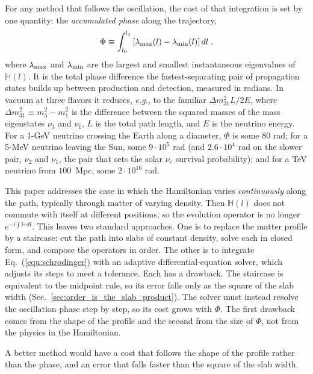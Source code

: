 \documentclass[final,5p,times,twocolumn,sort,compress]{elsarticle}
\makeatletter
\newcommand{\eg}{{\it e.g.}}
\newcommand{\eq}{Eq.}
\DeclareRobustCommand{\_}{%
  \ifmmode\nfss@text{\textunderscore}\else\textunderscore\allowbreak\fi}
\newcommand{\equ}[1]{\eq~(\ref{equ:#1})}
\makeatother
\begin{document}
For any method that follows the oscillation, the cost of that integration is set by one quantity: the \emph{accumulated phase} along the trajectory,
\begin{equation}
 \label{equ:phase}
 \Phi
 \equiv
 \int_{l_0}^{l_1} \left[\lambda_{\rm max}(l) - \lambda_{\rm min}(l)\right] dl \;,
\end{equation}
where $\lambda_{\rm max}$ and $\lambda_{\rm min}$ are the largest and smallest instantaneous eigenvalues of $\mathbb{H}(l)$. It is the total phase difference the fastest-separating pair of propagation states builds up between production and detection, measured in radians.  In vacuum at three flavors it reduces, \eg, to the familiar $\Delta m^2_{31} L / 2E$, where $\Delta m^2_{31} \equiv m_3^2 - m_1^2$ is the difference between the squared masses of the mass eigenstates $\nu_3$ and $\nu_1$, $L$ is the total path length, and $E$ is the neutrino energy. For a 1-GeV neutrino crossing the Earth along a diameter, $\Phi$ is some $80$ rad; for a 5-MeV neutrino leaving the Sun, some $9 \cdot 10^{5}$ rad (and $2.6 \cdot 10^{4}$ rad on the slower pair, $\nu_2$ and $\nu_1$, the pair that sets the solar $\nu_e$ survival probability); and for a TeV neutrino from $100$~Mpc, some $2 \cdot 10^{16}$ rad.

This paper addresses the case in which the Hamiltonian varies \emph{continuously} along the path, typically through matter of varying density. Then $\mathbb{H}(l)$ does not commute with itself at different positions, so the evolution operator is no longer $e^{-i\int \mathbb{H}\,dl}$. This leaves two standard approaches. One is to replace the matter profile by a staircase: cut the path into slabs of constant density, solve each in closed form, and compose the operators in order. The other is to integrate \equ{schrodinger} with an adaptive differential-equation solver, which adjusts its steps to meet a tolerance. Each has a drawback. The staircase is equivalent to the midpoint rule, so its error falls only as the square of the slab width (Sec.~\ref{sec:order_is_the_slab_product}). The solver must instead resolve the oscillation phase step by step, so its cost grows with $\Phi$. The first drawback comes from the shape of the profile and the second from the size of $\Phi$, not from the physics in the Hamiltonian. 

A better method would have a cost that follows the shape of the profile rather than the phase, and an error that falls faster than the square of the slab width.
\end{document}
